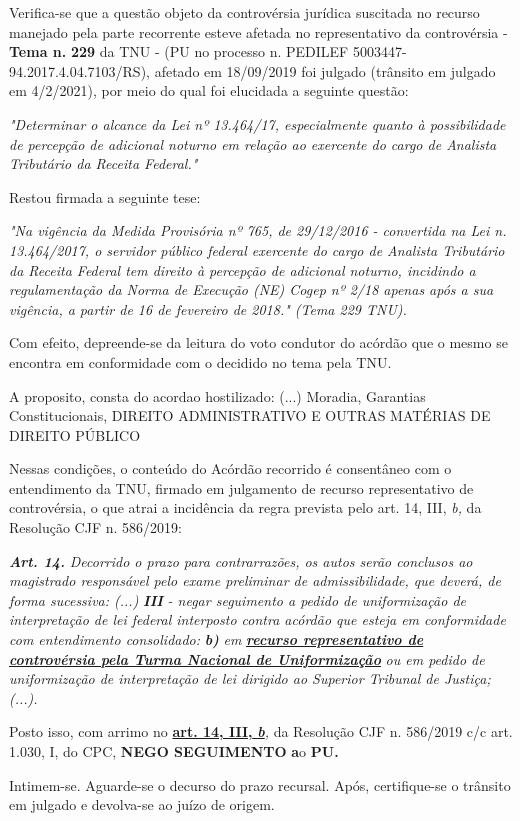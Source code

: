 \documentclass[12pt]{article}
\begin{document}
\justifying
\noindent Verifica-se que a questão objeto da controvérsia jurídica suscitada no recurso manejado pela parte recorrente esteve afetada no representativo da controvérsia - \textbf{Tema n. }\textbf{229} da TNU - (PU no processo n. PEDILEF 5003447-94.2017.4.04.7103/RS),  afetado em 18/09/2019 foi julgado (trânsito em julgado em 4/2/2021), por meio do qual foi elucidada a seguinte questão:

\noindent \textit{"Determinar o alcance da Lei nº 13.464/17, especialmente quanto à possibilidade de percepção de adicional noturno em relação ao exercente do cargo de Analista Tributário da Receita Federal."}

\noindent Restou firmada a seguinte tese:

\noindent \textit{"Na vigência da Medida Provisória nº 765, de 29/12/2016 - convertida na Lei n. 13.464/2017, o servidor público federal exercente do cargo de Analista Tributário da Receita Federal tem direito à percepção de adicional noturno, incidindo a regulamentação da Norma de Execução (NE) Cogep nº 2/18 apenas após a sua vigência, a partir de 16 de fevereiro de 2018." (Tema 229 TNU).}

\noindent Com efeito, depreende-se da leitura do voto condutor do acórdão que o mesmo se encontra em conformidade com o decidido no  tema pela TNU.

\noindent A proposito, consta do acordao hostilizado: (...) Moradia, Garantias Constitucionais, DIREITO ADMINISTRATIVO E OUTRAS MATÉRIAS DE DIREITO PÚBLICO

\noindent Nessas condições, o conteúdo do Acórdão recorrido é consentâneo com o entendimento da TNU, firmado em julgamento de recurso representativo de controvérsia, o que atrai a incidência da regra prevista pelo art. 14, III, \textit{b,} da Resolução CJF n. 586/2019:

\noindent \textit{\textbf{Art. 14.}}\textit{ Decorrido o prazo para contrarrazões, os autos serão conclusos ao magistrado responsável pelo exame preliminar de admissibilidade, que deverá, de forma sucessiva: (...) }\textit{\textbf{III }}\textit{- negar seguimento a pedido de uniformização de interpretação de lei federal interposto contra acórdão que esteja em conformidade com entendimento consolidado: }\textit{\textbf{b)}}\textit{ em }\uline{\textit{\textbf{recurso representativo de controvérsia pela Turma Nacional de Uniformização}}}\textit{ ou em pedido de uniformização de interpretação de lei dirigido ao Superior Tribunal de Justiça;(...).}

\noindent Posto isso, com arrimo no \uline{\textbf{art. 14, III, }}\uline{\textit{\textbf{b}}}\textit{,} da Resolução CJF n. 586/2019 c/c art. 1.030, I, do CPC, \textbf{NEGO SEGUIMENTO }\textbf{a}o\textbf{ PU}\textbf{.}

\noindent Intimem-se. Aguarde-se o decurso do prazo recursal. Após, certifique-se o trânsito em julgado e devolva-se ao juízo de origem.
\end{document}
